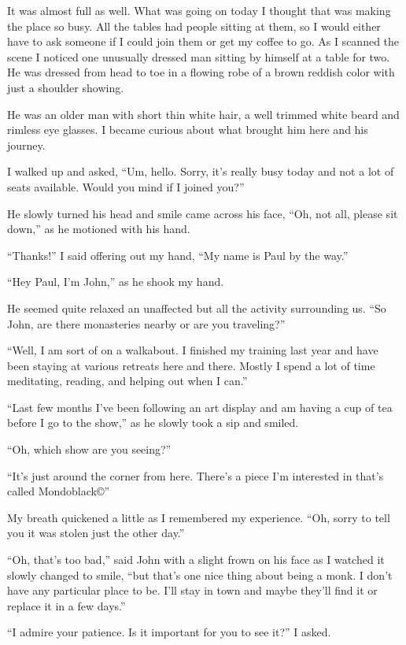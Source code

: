 It was almost full as well. What was going on today I thought
that was making the place so busy. All the tables had people
sitting at them, so I would either have to ask someone if I
could join them or get my coffee to go. As I scanned the scene I
noticed one unusually dressed man sitting by himself at a table
for two. He was dressed from head to toe in a flowing robe of a
brown reddish color with just a shoulder showing.

He was an older man with short thin white hair, a well trimmed
white beard and rimless eye glasses. I became curious about what
brought him here and his journey.

I walked up and asked, ``Um, hello. Sorry, it's really busy today and
not a lot of seats available. Would you mind if I joined you?''

He slowly turned his head and smile came across his face,
``Oh, not all, please sit down,'' as he motioned with his hand.

``Thanks!'' I said offering out my hand, ``My
name is Paul by the way.''

``Hey Paul, I'm John,'' as he shook my hand.

He seemed quite relaxed an unaffected but all the activity
surrounding us. ``So John, are there monasteries nearby or are
you traveling?''

``Well, I am sort of on a walkabout. I finished my training last
year and have been staying at various retreats here and
there. Mostly I spend a lot of time meditating, reading, and
helping out when I can.''

``Last few months I've been following an art display and am having
a cup of tea before I go to the show,'' as he slowly
took a sip and smiled.

``Oh, which show are you seeing?''

``It's just around the corner from here. There's a piece I'm
interested in that's called Mondoblack\copyright''

My breath quickened a little as I remembered my experience.
``Oh, sorry to tell you it was stolen just
the other day.''

``Oh, that's too bad,'' said John with a slight frown on his
face as I watched it slowly changed to smile, ``but that's one nice
thing about being a monk. I don't have any particular place to
be. I'll stay in town and maybe they'll find it or replace
it in a few days.''

``I admire your patience. Is it important for you to see it?'' I asked.

